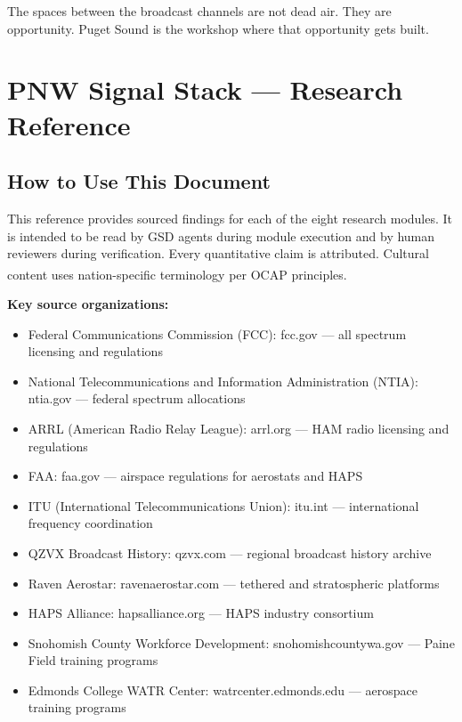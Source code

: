 \documentclass[11pt,letterpaper]{article}
\newcommand{\stageheader}[2]{%
  \noindent\colorbox{#2}{\makebox[\textwidth][l]{%
    \textcolor{white}{\bfseries\sffamily\hspace{6pt}#1\hspace{6pt}}}}%
  \vspace{0.5em}\par%
}
\begin{document}
The spaces between the broadcast channels are not dead air. They are opportunity. Puget Sound is the workshop where that opportunity gets built.

\newpage

\stageheader{STAGE 2 --- RESEARCH REFERENCE}{secondary}

\section{PNW Signal Stack --- Research Reference}

\subsection{How to Use This Document}

This reference provides sourced findings for each of the eight research modules. It is intended to be read by GSD agents during module execution and by human reviewers during verification. Every quantitative claim is attributed. Cultural content uses nation-specific terminology per OCAP\textsuperscript{\textregistered} principles.

\textbf{Key source organizations:}
\begin{itemize}
  \item Federal Communications Commission (FCC): fcc.gov --- all spectrum licensing and regulations
  \item National Telecommunications and Information Administration (NTIA): ntia.gov --- federal spectrum allocations
  \item ARRL (American Radio Relay League): arrl.org --- HAM radio licensing and regulations
  \item FAA: faa.gov --- airspace regulations for aerostats and HAPS
  \item ITU (International Telecommunications Union): itu.int --- international frequency coordination
  \item QZVX Broadcast History: qzvx.com --- regional broadcast history archive
  \item Raven Aerostar: ravenaerostar.com --- tethered and stratospheric platforms
  \item HAPS Alliance: hapsalliance.org --- HAPS industry consortium
  \item Snohomish County Workforce Development: snohomishcountywa.gov --- Paine Field training programs
  \item Edmonds College WATR Center: watrcenter.edmonds.edu --- aerospace training programs
\end{itemize}
\end{document}
